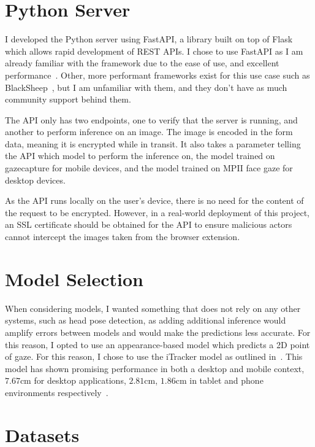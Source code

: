 \documentclass{report}
\begin{document}
\section{Python Server}

I developed the Python server using FastAPI, a library built on top of Flask which allows rapid development of REST APIs. I chose to use FastAPI as I am already familiar with the framework due to the ease of use, and excellent performance~\cite{klenov2015benchmark}. Other, more performant frameworks exist for this use case such as BlackSheep~\cite{prevato2018blacksheep}, but I am unfamiliar with them, and they don't have as much community support behind them.  

The API only has two endpoints, one to verify that the server is running, and another to perform inference on an image. The image is encoded in the form data, meaning it is encrypted while in transit. It also takes a parameter telling the API which model to perform the inference on, the model trained on gazecapture for mobile devices, and the model trained on MPII face gaze for desktop devices. 

As the API runs locally on the user's device, there is no need for the content of the request to be encrypted. However, in a real-world deployment of this project, an SSL certificate should be obtained for the API to ensure malicious actors cannot intercept the images taken from the browser extension. 


\section{Model Selection}

When considering models, I wanted something that does not rely on any other systems, such as head pose detection, as adding additional inference would amplify errors between models and would make the predictions less accurate. For this reason, I opted to use an appearance-based model which predicts a 2D point of gaze. For this reason, I chose to use the iTracker model as outlined in~\cite{krafka2016eye}. This model has shown promising performance in both a desktop and mobile context, \(7.67\text{cm}\) for desktop applications, \(2.81\text{cm}\), \(1.86\text{cm}\) in tablet and phone environments respectively~\cite{cheng2021survey}.

\section{Datasets}
\end{document}
